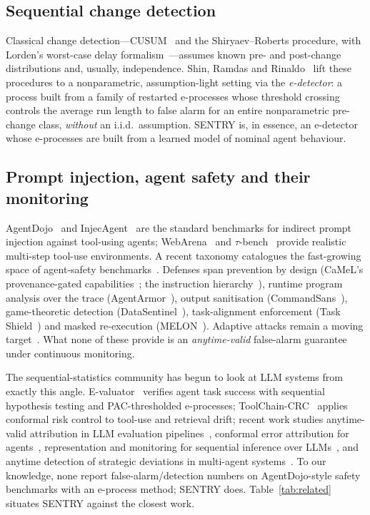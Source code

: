 \documentclass[10pt,journal,compsoc]{IEEEtran}
\theoremstyle{plain}
\theoremstyle{definition}
\begin{document}
\subsection{Sequential change detection}

Classical change detection---CUSUM~\cite{page1954cusum} and the
Shiryaev--Roberts procedure, with Lorden's worst-case delay
formalism~\cite{lorden1971procedures}---assumes known pre- and post-change
distributions and, usually, independence. Shin, Ramdas and
Rinaldo~\cite{shin2023edetectors} lift these procedures to a nonparametric,
assumption-light setting via the \emph{e-detector}: a process built from a
family of restarted e-processes whose threshold crossing controls the average
run length to false alarm for an entire nonparametric pre-change class,
\emph{without} an i.i.d.\ assumption. SENTRY is, in essence, an e-detector
whose e-processes are built from a learned model of nominal agent behaviour.

\subsection{Prompt injection, agent safety and their monitoring}

AgentDojo~\cite{debenedetti2024agentdojo} and
InjecAgent~\cite{zhan2024injecagent} are the standard benchmarks for indirect
prompt injection against tool-using agents; WebArena~\cite{zhou2023webarena}
and \(\tau\)-bench~\cite{yao2024taubench} provide realistic multi-step
tool-use environments. A recent taxonomy catalogues the fast-growing space of
agent-safety benchmarks~\cite{li2026taxonomy}. Defenses span prevention by
design (CaMeL's provenance-gated capabilities~\cite{debenedetti2025camel}; the
instruction hierarchy~\cite{wallace2024instructionhierarchy}), runtime
program analysis over the trace (AgentArmor~\cite{wang2025agentarmor}),
output sanitisation (CommandSans~\cite{das2025commandsans}), game-theoretic
detection (DataSentinel~\cite{liu2025datasentinel}), task-alignment
enforcement (Task Shield~\cite{jia2024taskshield}) and masked re-execution
(MELON~\cite{zhu2025melon}). Adaptive attacks remain a moving
target~\cite{nasr2025attackersecond}. What none of these provide is an
\emph{anytime-valid} false-alarm guarantee under continuous monitoring.

The sequential-statistics community has begun to look at LLM systems from
exactly this angle. E-valuator~\cite{sadhuka2025evaluator} verifies agent
task success with sequential hypothesis testing and PAC-thresholded
e-processes; ToolChain-CRC~\cite{opoku2026toolchain} applies conformal risk
control to tool-use and retrieval drift; recent work studies anytime-valid
attribution in LLM evaluation pipelines~\cite{li2026whodrifted}, conformal
error attribution for agents~\cite{feng2026conformalattribution},
representation and monitoring for sequential inference over
LLMs~\cite{xie2026sequential}, and anytime detection of strategic deviations
in multi-agent systems~\cite{gauthier2026strategic}. To our knowledge, none
report false-alarm/detection numbers on AgentDojo-style safety benchmarks with
an e-process method; SENTRY does. Table~\ref{tab:related} situates SENTRY
against the closest work.
\end{document}

